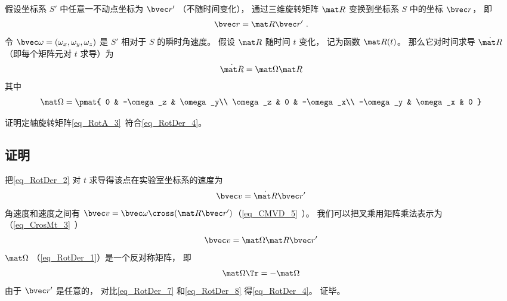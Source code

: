 

假设坐标系 $S'$ 中任意一不动点坐标为 $\bvec r'$ （不随时间变化）， 通过三维旋转矩阵 $\mat R$ 变换到坐标系 $S$ 中的坐标 $\bvec r$， 即
\begin{equation}\label{eq_RotDer_2}
\bvec r = \mat R \bvec r'~.
\end{equation}
令 $\bvec\omega = (\omega_x, \omega_y, \omega_z)$ 是 $S'$ 相对于 $S$ 的瞬时角速度。 假设 $\mat R$ 随时间 $t$ 变化， 记为函数 $\mat R(t)$。 那么它对时间求导 $\dot{\mat R}$ （即每个矩阵元对 $t$ 求导）为
\begin{equation}\label{eq_RotDer_4}
\dot{\mat R} = \mat \Omega \mat R
\end{equation}
其中
\begin{equation}\label{eq_RotDer_1}
\mat \Omega = \pmat{
0 & -\omega_z & \omega_y\\
\omega_z & 0 & -\omega_x\\
-\omega_y & \omega_x & 0
}
\end{equation}

\begin{exercise}{}\label{exe_RotDer_1}
证明定轴旋转矩阵\autoref{eq_RotA_3}~符合\autoref{eq_RotDer_4}。
\end{exercise}

\subsection{证明}
把\autoref{eq_RotDer_2} 对 $t$ 求导得该点在实验室坐标系的速度为
\begin{equation}\label{eq_RotDer_7}
\bvec v = \dot{\mat R} \bvec r'
\end{equation}
角速度和速度之间有 $\bvec v = \bvec \omega \cross (\mat R \bvec r')$（\autoref{eq_CMVD_5}~）。 我们可以把叉乘用矩阵乘法表示为（\autoref{eq_CrosMt_3}~）
\begin{equation}\label{eq_RotDer_8}
\bvec v = \mat\Omega \mat R \bvec r'
\end{equation}
$\mat\Omega$ （\autoref{eq_RotDer_1}）是一个反对称矩阵， 即
\begin{equation}
\mat \Omega\Tr = -\mat \Omega
\end{equation}
由于 $\bvec r'$ 是任意的， 对比\autoref{eq_RotDer_7} 和\autoref{eq_RotDer_8} 得\autoref{eq_RotDer_4}。 证毕。
